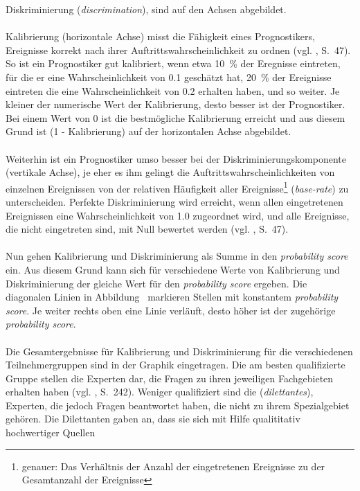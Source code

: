 Diskriminierung (\emph{discrimination}), sind auf den Achsen abgebildet. \\ \\ 
Kalibrierung (horizontale Achse) misst die Fähigkeit eines Prognostikers,
Ereignisse korrekt nach ihrer
Auftrittswahrscheinlichkeit zu ordnen (vgl. \cite{Tetlock}, S.~47). So ist ein
Prognostiker gut kalibriert, wenn etwa 10~\% der Eregnisse eintreten, für die
er eine Wahrscheinlichkeit von 0.1 geschätzt hat, 20~\% der Ereignisse eintreten
die eine Wahrscheinlichkeit von 0.2 erhalten haben, und so weiter. Je kleiner
der numerische Wert der Kalibrierung, desto besser ist der Prognostiker. Bei
einem Wert von 0 ist die bestmögliche Kalibrierung erreicht und aus diesem Grund
ist (1 - Kalibrierung) auf der horizontalen Achse abgebildet. \\ \\
Weiterhin ist ein Prognostiker umso besser bei der Diskriminierungskomponente
(vertikale Achse),
je eher es ihm gelingt die Auftrittswahrscheinlichkeiten von einzelnen
Ereignissen von der relativen Häufigkeit aller Ereignisse\footnote{
genauer: Das Verhältnis der Anzahl der eingetretenen Ereignisse zu der
Gesamtanzahl der Ereignisse} (\emph{base-rate})
zu unterscheiden. Perfekte Diskriminierung wird erreicht, wenn allen 
eingetretenen Ereignissen eine Wahrscheinlichkeit von 1.0 zugeordnet wird, und
alle Ereignisse, die nicht eingetreten sind, mit Null bewertet werden
(vgl. \cite{Tetlock}, S.~47).\\ \\
Nun gehen Kalibrierung und Diskriminierung als Summe in den
\emph{probability score} ein. Aus diesem Grund kann sich für verschiedene
Werte von Kalibrierung und Diskriminierung der gleiche Wert für den
\emph{probability score} ergeben. Die diagonalen Linien in Abbildung~\xcom
markieren Stellen mit konstantem \emph{probability score}. Je weiter rechts oben
eine Linie verläuft, desto höher ist der zugehörige \emph{probability score}.
\\ \\
Die Gesamtergebnisse für Kalibrierung und Diskriminierung für die verschiedenen
Teilnehmergruppen sind in der Graphik eingetragen. Die am besten qualifizierte
Gruppe stellen die Experten dar, die Fragen zu ihren jeweiligen Fachgebieten
erhalten haben (vgl. \cite{Tetlock}, S.~242). Weniger qualifiziert sind die 
\grqq (\emph{dilettantes}), Experten, die jedoch Fragen
beantwortet haben, die nicht zu ihrem Spezialgebiet gehören. Die Dilettanten
gaben an, dass sie sich mit Hilfe qualititativ hochwertiger Quellen
